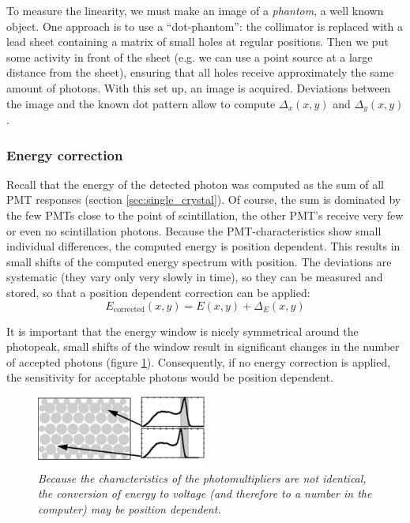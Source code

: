 \documentclass[11pt,oneside]{article}
\begin{document}
To measure the linearity, we must make an image of a {\em phantom}, a well
known object. One approach is to use a ``dot-phantom'': the collimator is
replaced with a lead sheet containing a matrix of small holes at regular
positions. Then we put some activity in front of the sheet (e.g. we can use a
point source at a large distance from the sheet), ensuring that all holes
receive approximately the same amount of photons. With this set up, an image
is acquired. Deviations between the image and the known dot pattern allow to
compute $\Delta_x(x,y)$ and $\Delta_y(x,y)$.

\subsubsection{Energy correction}
Recall that the energy of the detected photon was computed as the sum of all
PMT responses (section \ref{sec:single_crystal}). Of course, the sum is
dominated by the few PMTs close to the point of scintillation, the other PMT's
receive very few or even no scintillation photons. Because the
PMT-characteristics show small individual differences, the computed energy is
position dependent. This results in small shifts of the computed energy
spectrum with position. The deviations are systematic (they vary only very
slowly in time), so they can be measured and stored, so that a position
dependent correction can be applied:
\begin{equation}
  E_{\mbox{corrected}}(x,y) = E(x,y) + \Delta_E(x,y)
\end{equation}

It is important that the energy window is nicely symmetrical around the
photopeak, small shifts of the window result in significant changes in the
number of accepted photons (figure \ref{fig:energy_corr}). Consequently, if no
energy correction is applied, the sensitivity for acceptable photons would be
position dependent.

\begin{figure}[tb]
\centering
\includegraphics[width=0.5\textwidth]{figs/fig_energy_corr.pdf}
\caption{\label{fig:energy_corr} \emph{Because the characteristics of the
photomultipliers are not identical, the conversion of energy to voltage (and
therefore to a number in the computer) may be position dependent.}}
\end{figure}
\end{document}
